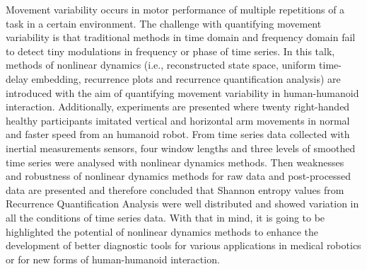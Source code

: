 \documentclass[12pt]{article}
\begin{document}
Movement variability occurs in motor performance 
of multiple repetitions of a task in a certain environment.
The challenge with quantifying movement variability 
is that traditional methods in time domain and frequency domain 
fail to detect tiny modulations in frequency or phase of time series. 
In this talk, methods of nonlinear dynamics (i.e., 
reconstructed state space, uniform time-delay embedding, 
recurrence plots and recurrence quantification analysis) 
are introduced with the aim of quantifying movement variability
in human-humanoid interaction.
Additionally, experiments are presented where 
twenty right-handed healthy participants 
imitated vertical and horizontal arm movements in normal 
and faster speed from an humanoid robot.
From time series data collected with inertial measurements
sensors, four window lengths and three levels of smoothed 
time series were analysed with nonlinear dynamics methods.
Then weaknesses and robustness of nonlinear dynamics 
methods for raw data and post-processed data are presented
and therefore concluded that 
Shannon entropy values from Recurrence Quantification Analysis 
were well distributed and showed variation in all the 
conditions of time series data.
With that in mind, it is going to be highlighted 
the potential of nonlinear dynamics methods to enhance the 
development of better diagnostic tools 
for various applications in medical robotics or 
for new forms of human-humanoid interaction.
\vspace{5mm}
\end{document}
